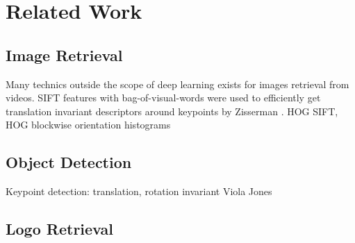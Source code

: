\chapter{Related Work}\label{c:relatedwork}

\section{Image Retrieval}

Many technics outside the scope of deep learning exists for images retrieval from videos. SIFT features \cite{Lowe:2004:DIF:993451.996342} with bag-of-visual-words were used to efficiently get translation invariant descriptors around keypoints by Zisserman \cite{Sivic:2003:VGT:946247.946751}. HOG \cite{Dalal:2005:HOG:1068507.1069007} SIFT, HOG blockwise orientation histograms

\section{Object Detection}\label{s:c-objectdetection}

Keypoint detection: translation, rotation invariant
Viola Jones

\section{Logo Retrieval}
